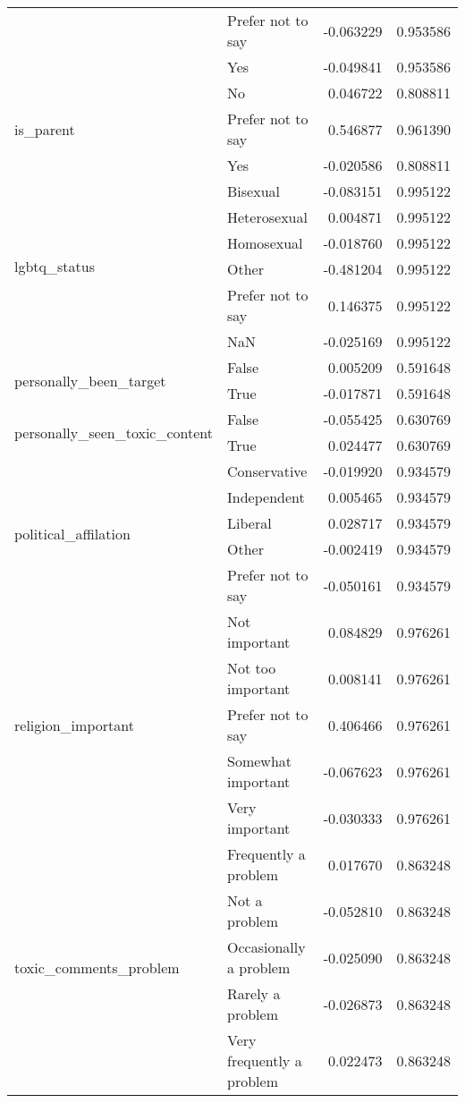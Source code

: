 \begin{longtable}{llrr}
 & Prefer not to say & -0.063229 & 0.953586 \\
 & Yes & -0.049841 & 0.953586 \\
\cline{1-4}
\multirow[t]{3}{*}{is_parent} & No & 0.046722 & 0.808811 \\
 & Prefer not to say & 0.546877 & 0.961390 \\
 & Yes & -0.020586 & 0.808811 \\
\cline{1-4}
\multirow[t]{6}{*}{lgbtq_status} & Bisexual & -0.083151 & 0.995122 \\
 & Heterosexual & 0.004871 & 0.995122 \\
 & Homosexual & -0.018760 & 0.995122 \\
 & Other & -0.481204 & 0.995122 \\
 & Prefer not to say & 0.146375 & 0.995122 \\
 & NaN & -0.025169 & 0.995122 \\
\cline{1-4}
\multirow[t]{2}{*}{personally_been_target} & False & 0.005209 & 0.591648 \\
 & True & -0.017871 & 0.591648 \\
\cline{1-4}
\multirow[t]{2}{*}{personally_seen_toxic_content} & False & -0.055425 & 0.630769 \\
 & True & 0.024477 & 0.630769 \\
\cline{1-4}
\multirow[t]{5}{*}{political_affilation} & Conservative & -0.019920 & 0.934579 \\
 & Independent & 0.005465 & 0.934579 \\
 & Liberal & 0.028717 & 0.934579 \\
 & Other & -0.002419 & 0.934579 \\
 & Prefer not to say & -0.050161 & 0.934579 \\
\cline{1-4}
\multirow[t]{5}{*}{religion_important} & Not important & 0.084829 & 0.976261 \\
 & Not too important & 0.008141 & 0.976261 \\
 & Prefer not to say & 0.406466 & 0.976261 \\
 & Somewhat important & -0.067623 & 0.976261 \\
 & Very important & -0.030333 & 0.976261 \\
\cline{1-4}
\multirow[t]{5}{*}{toxic_comments_problem} & Frequently a problem & 0.017670 & 0.863248 \\
 & Not a problem & -0.052810 & 0.863248 \\
 & Occasionally a problem & -0.025090 & 0.863248 \\
 & Rarely a problem & -0.026873 & 0.863248 \\
 & Very frequently a problem & 0.022473 & 0.863248 \\
\cline{1-4}
\end{longtable}
